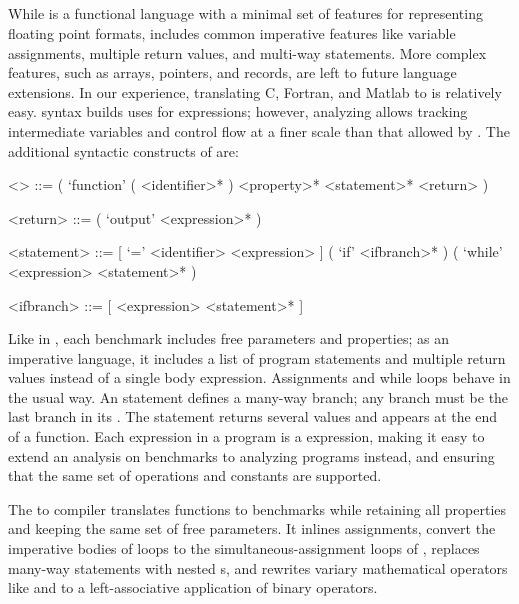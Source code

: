 \documentclass[main.tex]{subfiles}
\begin{document}
\subsection{\surface}

While \core is a functional language
  with a minimal set of features
  for representing floating point formats,
  \surface includes common imperative features
  like variable assignments,
  multiple return values,
  and multi-way  statements.
More complex features,
  such as arrays, pointers, and records,
  are left to future language extensions.
In our experience,
  translating C, Fortran, and Matlab to \surface is relatively easy.
\surface syntax builds uses \core for expressions;
  however, analyzing \surface allows tracking intermediate variables
  and control flow at a finer scale than that allowed by \core.
The additional syntactic constructs of \surface are:

\begin{grammar}
<\surface> ::= ( `function' ( <identifier>* ) <property>* <statement>* <return> )

<return> ::= ( `output' <expression>* )

<statement> ::= [ `=' <identifier> <expression> ]
\alt ( `if' <ifbranch>* )
\alt ( `while' <expression> <statement>* )

<ifbranch> ::= [ <expression> <statement>* ]
\end{grammar}

Like in \core, each \surface benchmark
  includes free parameters and properties;
  as an imperative language,
  it includes a list of program statements
  and multiple return values
  instead of a single body expression.
Assignments and while loops behave in the usual way.
An  statement defines a many-way branch;
  any  branch must be the last branch in its .
The  statement returns several values and appears
  at the end of a function.
Each expression in a \surface program is a \core expression,
  making it easy to extend an analysis on \core benchmarks
  to analyzing \surface programs instead,
  and ensuring that the same set of operations and constants
  are supported.

The \surface to \core compiler
  translates \surface functions to \core benchmarks
  while retaining all properties and keeping the same set of free parameters.
It inlines assignments, convert the imperative bodies of \surface loops
  to the simultaneous-assignment loops of \core,
  replaces many-way  statements with nested s,
  and rewrites variary mathematical operators like \C{+} and \C{*}
  to a left-associative application of binary operators.
\end{document}
